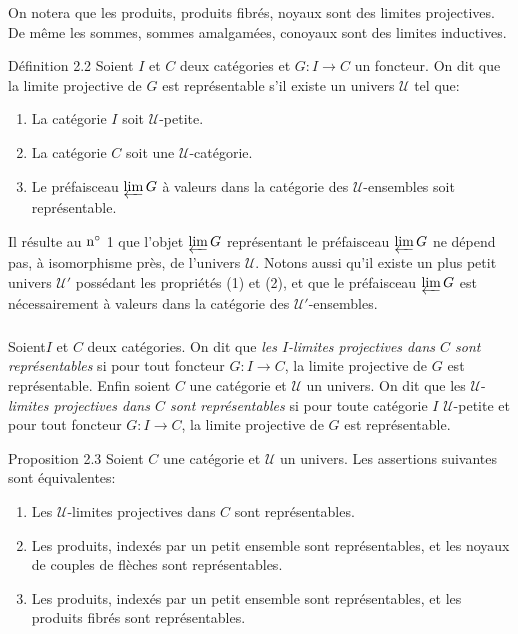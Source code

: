 \documentclass[10pt]{../fichiers-configuration-latex/smfart}
\def\labelenumi{(\theenumi)}
\begin{document}
On notera que les produits, produits fibrés, noyaux sont des limites
projectives. De même les sommes, sommes amalgamées, conoyaux sont
des %
limites inductives.

\begin{enonce*}{Définition 2.2}
Soient $I$ et $C$ deux catégories et $G:I\rightarrow C$ un foncteur.
On dit que la limite projective de $G$ est représentable s'il existe
un univers $𝒰$ tel que:
\begin{enumerate}
\renewcommand{\labelenumi}{\theenumi)}
\item La catégorie $I$ soit $𝒰$-petite.

\item La catégorie $C$ soit une $𝒰$-catégorie.

\item Le préfaisceau $\varprojlim G$ à valeurs dans la
  catégorie des $𝒰$-ensembles soit représentable.
\end{enumerate}
\end{enonce*}

Il résulte au ${\rm n^\circ}$ 1 que l'objet $\varprojlim G$
représentant le préfaisceau $\varprojlim G$ ne dépend pas, à
isomorphisme près, de l'univers $𝒰$. Notons aussi qu'il
existe un plus petit univers $𝒰'$ possédant les propriétés
(1) et (2), et que le préfaisceau $\varprojlim G$ est nécessairement
à valeurs dans la catégorie des $𝒰'$-ensembles.

\setcounter{subsection}{2} \setcounter{subsubsection}{0}
\subsubsection{}
Soient\pageoriginale $I$ et $C$ deux catégories. On dit que
\emph{les $I$-limites projectives dans $C$ sont
  représentables} si pour tout foncteur $G:I\rightarrow C$, la
  limite projective de $G$ est représentable. Enfin soient $C$ une
  catégorie et $𝒰$ un univers. On dit que les
  $𝒰$-\emph{limites
  projectives dans $C$ sont représentables} si pour toute
  catégorie $I$ $𝒰$-petite et pour tout foncteur $G:I\rightarrow
  C$, la limite projective de $G$ est représentable.

\begin{enonce*}{Proposition 2.3}
Soient $C$ une catégorie et $𝒰$ un univers. Les assertions suivantes sont équivalentes:
\begin{enumerate}
\renewcommand{\theenumi}{\roman{enumi}}
\renewcommand{\labelenumi}{\theenumi)}
\item Les $𝒰$-limites projectives dans $C$ sont représentables.

\item Les produits, indexés par un petit ensemble sont
  représentables, et les noyaux de couples de flèches sont
  représentables.
\item Les produits, indexés par un petit ensemble sont
  représentables, et les produits fibrés sont représentables.
\end{enumerate}
\end{enonce*}
\end{document}
